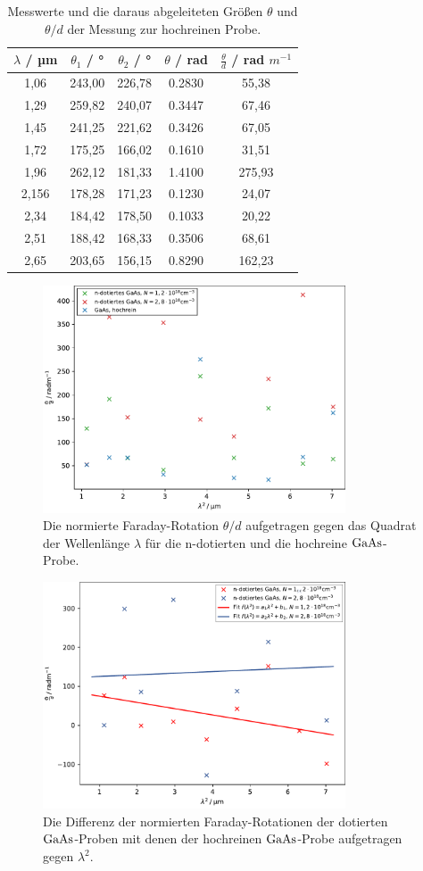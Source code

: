 \begin{table}[h]
  \centering
  \caption{Messwerte und die daraus abgeleiteten Größen $\theta$ und $\theta/d$ der Messung zur hochreinen Probe.}
  \label{tab:probe3}
  \begin{tabular}{S[table-format=1.1] S S S S}
    {$\lambda$ / µm} & {$\theta_1$ / °} & {$\theta_2$ / °} & {$\theta$ / rad} & {$\frac{\theta}{d}$ / rad $m^{-1}$}\\
    ,06 &  243,00 &  226,78 & 0.2830 & 55,38\\
    1,29 &  259,82 &  240,07 & 0.3447 & 67,46\\
    1,45 &  241,25 &  221,62 & 0.3426 & 67,05\\
    1,72 &  175,25 &  166,02 & 0.1610 & 31,51\\
    1,96 &  262,12 &  181,33 & 1.4100 & 275,93\\
    2,156 & 178,28 &  171,23 & 0.1230 & 24,07\\
    2,34 & 184,42 &  178,50 & 0.1033 & 20,22\\
    2,51 & 188,42 &  168,33 & 0.3506 & 68,61\\
    2,65 & 203,65 &  156,15 & 0.8290 & 162,23\\
  \end{tabular}
\end{table}
\clearpage
\begin{figure}[H]
  \centering
  \includegraphics[width=0.8\textwidth]{plots/GaAs.pdf}
  \caption{Die normierte Faraday-Rotation $\theta/d$ aufgetragen gegen das Quadrat der Wellenlänge $\lambda$ für die n-dotierten und die hochreine $\ce{GaAs}$-Probe.}
  \label{GaAs1}
\end{figure}

\begin{figure}[H]
  \centering
  \includegraphics[width=0.8\textwidth]{plots/GaAs2.pdf}
  \caption{Die Differenz der normierten Faraday-Rotationen der dotierten $\ce{GaAs}$-Proben mit denen der hochreinen $\ce{GaAs}$-Probe aufgetragen gegen $\lambda^2$.}
  \label{GaAs2}
\end{figure}
\clearpage
